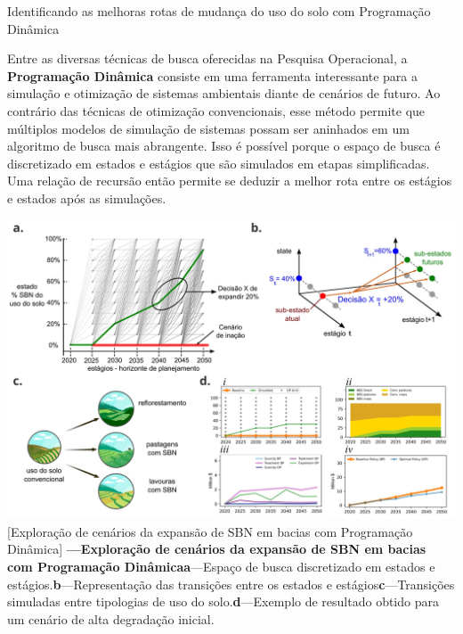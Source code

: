 \documentclass[./main.tex]{subfiles}
\begin{document}
\begin{simplebox}[
    float=ht!,
    label={destaque_programacao_dinamica},
    nameref={Programação Dinâmica}
    ]{Identificando as melhoras rotas de mudança do uso do solo com Programação Dinâmica}
    \footnotesize
    \begin{minipage}[t]{\linewidth}  
    \par Entre as diversas técnicas de busca oferecidas na Pesquisa Operacional, a \textbf{Programação Dinâmica} consiste em uma ferramenta interessante para a simulação e otimização de sistemas ambientais diante de cenários de futuro. Ao contrário das técnicas de otimização convencionais, esse método permite que múltiplos modelos de simulação de sistemas possam ser aninhados em um algoritmo de busca mais abrangente. Isso é possível porque o espaço de busca é discretizado em estados e estágios que são simulados em etapas simplificadas. Uma relação de recursão então permite se deduzir a melhor rota entre os estágios e estados após as simulações.   
    \end{minipage}
    
    \begin{minipage}[t]{\linewidth}
        \begin{minipage}[t]{\linewidth}
        \vspace*{5pt}
        	\includegraphics[width=\linewidth]{figs/fig_dp.jpg}	
        	[Exploração de cenários da expansão de SBN em bacias com Programação Dinâmica]{
                \textbf{---\;Exploração de cenários da expansão de SBN em bacias com Programação Dinâmica}\;\textbf{a}\;---\;Espaço de busca discretizado em estados e estágios.\;\textbf{b}\;---\;Representação das transições entre os estados e estágios\;\textbf{c}\;---\;Transições simuladas entre tipologias de uso do solo.\;\textbf{d}\;---\;Exemplo de resultado obtido para um cenário de alta degradação inicial. 
        	}
            \label{fig:dp}  %
        \vspace*{5pt}
        \end{minipage}
    \end{minipage}
    

\end{simplebox}
\end{document}
